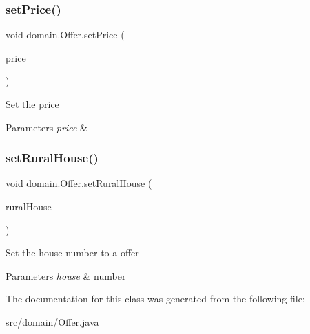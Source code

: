 \subsubsection{\texorpdfstring{setPrice()}{setPrice()}}
{\footnotesize\ttfamily void domain.\+Offer.\+set\+Price (\begin{DoxyParamCaption}\item[{float}]{price }\end{DoxyParamCaption})}

Set the price


\begin{DoxyParams}{Parameters}
{\em price} & \\
\hline
\end{DoxyParams}
\mbox{\label{classdomain_1_1_offer_a2050ed4cf76a2a2863d08e89bdf4a7df}} 
\subsubsection{\texorpdfstring{setRuralHouse()}{setRuralHouse()}}
{\footnotesize\ttfamily void domain.\+Offer.\+set\+Rural\+House (\begin{DoxyParamCaption}\item[{\mbox{\hyperlink{classdomain_1_1_rural_house}{Rural\+House}}}]{rural\+House }\end{DoxyParamCaption})}

Set the house number to a offer


\begin{DoxyParams}{Parameters}
{\em house} & number \\
\hline
\end{DoxyParams}


The documentation for this class was generated from the following file\+:\begin{DoxyCompactItemize}
\item 
src/domain/Offer.\+java\end{DoxyCompactItemize}
